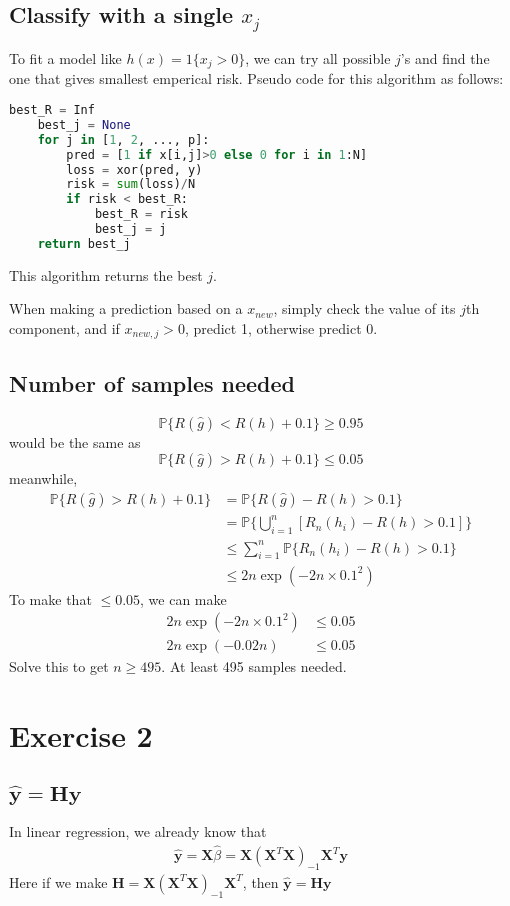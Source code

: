 \documentclass[12pt]{article}
\begin{document}
\subsection{Classify with a single $x_j$}
To fit a model like $h(x)=1\{x_j>0\}$,
we can try all possible $j$'s and find the one that gives smallest emperical risk.
Pseudo code for this algorithm as follows:
\begin{lstlisting}[language=Python]
	best_R = Inf
	best_j = None
	for j in [1, 2, ..., p]:
		pred = [1 if x[i,j]>0 else 0 for i in 1:N]
		loss = xor(pred, y)
		risk = sum(loss)/N
		if risk < best_R:
			best_R = risk
			best_j = j
	return best_j
\end{lstlisting}
This algorithm returns the best $j$.

When making a prediction based on a $x_{new}$, 
simply check the value of its $j$th component,
and if $x_{new, j}>0$, predict 1,
otherwise predict 0.

\subsection{Number of samples needed}
\[ \mathbb{P}\{ R(\hat{g}) < R(h) + 0.1 \}  \geq 0.95  \]
would be the same as
\[ \mathbb{P}\{ R(\hat{g}) > R(h) + 0.1 \}  \leq 0.05  \]
meanwhile,
\begin{align*}
	\mathbb{P}\{ R(\hat{g}) > R(h) + 0.1 \} & = \mathbb{P}\{ R(\hat{g}) - R(h) > 0.1 \} \\
	& = \mathbb{P}\{ \bigcup_{i=1}^n [ R_n(h_i) - R(h) >0.1 ] \}   \\
	& \leq  \sum_{i=1}^n \mathbb{P}\{  R_n(h_i) - R(h) >0.1  \}  \\
	& \leq 2n \exp(-2n \times 0.1^2)
\end{align*}
To make that $\leq 0.05$, we can make
\begin{align*}
	2n \exp(-2n \times 0.1^2) & \leq 0.05  \\
	2n \exp(-0.02n) & \leq 0.05
\end{align*}
Solve this to get $n \geq 495$. At least 495 samples needed.

\section{Exercise 2}

\subsection{$\hat{\bm{y}}=\bm{H}\bm{y}$}
In linear regression, we already know that
\begin{align*}
	\hat{\bm{y}} = \bm{X} \hat{\beta} = \bm{X}(\bm{X}^T\bm{X})_{-1} \bm{X}^T \bm{y}
\end{align*}
Here if we make $\bm{H} = \bm{X}(\bm{X}^T\bm{X})_{-1} \bm{X}^T$, 
then $\hat{\bm{y}}=\bm{H}\bm{y}$
\end{document}
